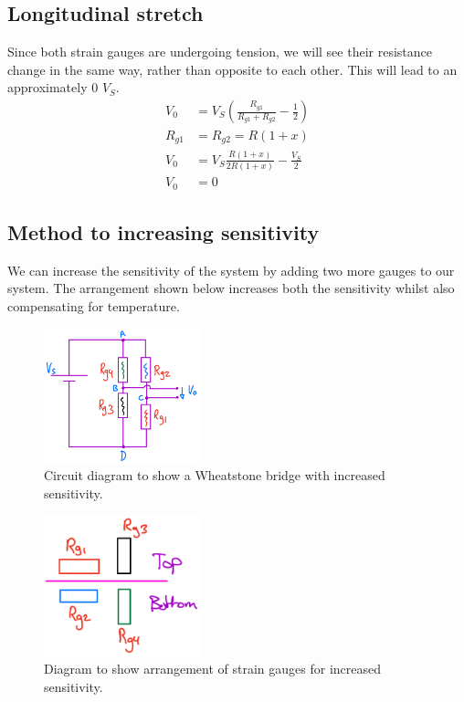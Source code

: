 \documentclass[12pt]{article}
\numberwithin{equation}{section}
\begin{document}
\subsection*{Longitudinal stretch}
Since both strain gauges are undergoing tension, we will see their resistance change in the same way, rather than opposite to each other. This will lead to an approximately 0 $V_S$. 
\begin{align}
  V_0 &= V_S \left( \frac{R_{g1}}{R_{g1} + R_{g2}} - \frac{1}{2} \right)\\
  R_{g1} &= R_{g2} = R(1+x)\\
  V_0 &= V_S\frac{R(1+x)}{2R(1+x)} - \frac{V_S}{2}\\
  V_0 &= 0 
\end{align}
\subsection*{Method to increasing sensitivity}
We can increase the sensitivity of the system by adding two more gauges to our system. The arrangement shown below increases both the sensitivity whilst also compensating for temperature.
\begin{figure}[H]
  \centering
  \includegraphics[width=0.4\textwidth]{./img/4-4circuit.png}
  \caption{Circuit diagram to show a Wheatstone bridge with increased sensitivity.}
\end{figure}
\begin{figure}[H]
  \centering
  \includegraphics[width=0.4\textwidth]{./img/4-4arrangement.png}
  \caption{Diagram to show arrangement of strain gauges for increased sensitivity.}
\end{figure}
\end{document}
